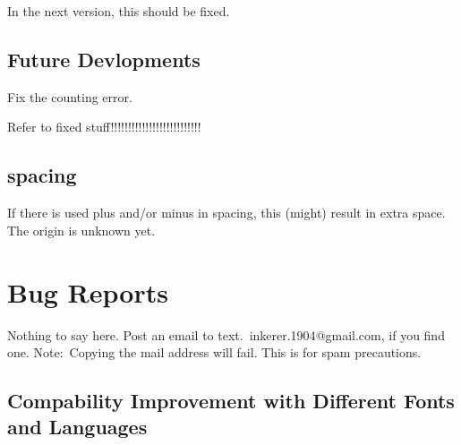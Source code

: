 \documentclass[12pt,a4paper]{scrreprt}
\begin{document}
In the next version, this should be fixed.

\section{Future Devlopments}
Fix the counting error.

Refer to fixed stuff!!!!!!!!!!!!!!!!!!!!!!!!!!

\section{spacing}
If there is used plus and/or minus in spacing, this (might) result in extra space. The origin is unknown yet.

\chapter{Bug Reports}
Nothing to say here. Post an email to \mbox{text\color{white}.\color{black}\hspace*{-7.5pt} inkerer.1904$@$gmail.com}, if you find one. Note:~Copying the mail address will fail. This is for spam precautions.


\section{Compability Improvement with Different Fonts and Languages}
\end{document}
